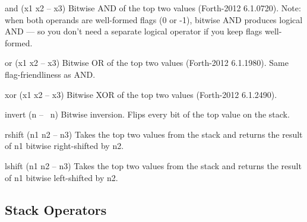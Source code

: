 \documentclass[a4paper, 11pt, openany]{book}
\begin{document}
\begin{forthbox}
  and     (x1 x2 -- x3)
          Bitwise AND of the top two values (Forth-2012 6.1.0720).
          Note: when both operands are well-formed flags (0 or
          -1), bitwise AND produces logical AND --- so you don't
          need a separate logical operator if you keep flags
          well-formed.

  or      (x1 x2 -- x3)
          Bitwise OR of the top two values (Forth-2012 6.1.1980).
          Same flag-friendliness as AND.

  xor     (x1 x2 -- x3)
          Bitwise XOR of the top two values (Forth-2012 6.1.2490).

  invert  (n -- ~n)
          Bitwise inversion. Flips every bit of the top value
          on the stack.

  rshift  (n1 n2 -- n3)
          Takes the top two values from the stack and returns the
          result of n1 bitwise right-shifted by n2.

  lshift  (n1 n2 -- n3)
          Takes the top two values from the stack and returns the
          result of n1 bitwise left-shifted by n2.
\end{forthbox}

\subsection{Stack Operators}
\end{document}
